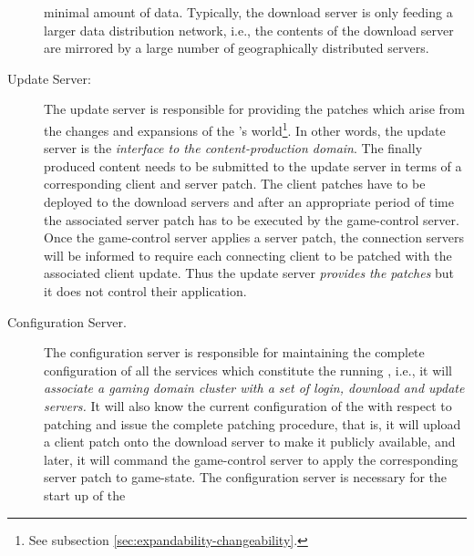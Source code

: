 \documentclass[a4paper, 10pt]{book}
\begin{document}
\begin{description}
                        minimal amount of data. 
                        Typically, the download server is only feeding a larger data
                        distribution network, i.e., the contents of the download server are
                        mirrored by a large number of geographically distributed servers. 
                    \item[Update Server:] The update server is responsible
                        for providing the patches which arise from the changes and
                        expansions of the \MMORG's world\footnote{See subsection
                        \vref{sec:expandability-changeability}.}.
                        In other words, the update server is the \emph{interface to the
                        content-production domain}. The finally produced content needs to
                        be submitted to the update server in terms of a corresponding client
                        and server patch. The client patches have to be deployed to the
                        download servers and after an appropriate period of time the
                        associated server patch has to be executed by the game-control
                        server. Once the game-control server applies a server patch, the
                        connection servers will be informed to require each connecting
                        client to be patched with the associated client update.
                        Thus the update server \emph{provides the patches} but
                        it does not control their application.
                    \item[Configuration Server.]  The configuration server is responsible
                        for maintaining the complete configuration of all the services which
                        constitute the running \MMORG, i.e., it will \emph{associate a gaming
                        domain cluster with a set of login, download and update servers.} It
                        will also know the current configuration of the \MMORG with respect
                        to patching and issue the complete patching procedure, that is, it
                        will upload a client patch onto the download server to make it
                        publicly available, and later, it will command the game-control
                        server to apply the corresponding server patch to game-state.
                        The configuration server is necessary for the start up of the

\end{description}
\end{document}
